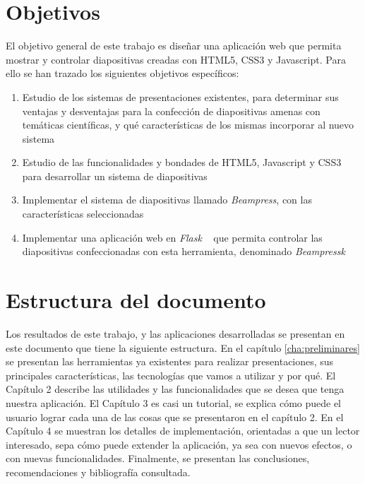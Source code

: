 \begin{introduction}
	\section{Objetivos} %
	\label{sec:objetivos}

		El objetivo general de este trabajo es diseñar una aplicación web que permita mostrar y controlar diapositivas creadas con HTML5, CSS3 y Javascript. Para ello se han trazado los siguientes objetivos específicos:

		\begin{enumerate}
			\item Estudio de los sistemas de presentaciones existentes, para determinar sus ventajas y desventajas para la confección de diapositivas amenas con temáticas científicas, y qué características de los mismas incorporar al nuevo sistema
			\item Estudio de las funcionalidades y bondades de HTML5, Javascript y CSS3 para desarrollar un sistema de diapositivas
			\item Implementar el sistema de diapositivas llamado \textit{Beampress}, con las características seleccionadas
			\item Implementar una aplicación web en \textit{Flask} ~\cite{flask} que permita controlar las diapositivas confeccionadas con esta herramienta, denominado \textit{Beampressk}
		\end{enumerate}

	\section*{Estructura del documento} %
	\label{sec:estructura_del_documento}
	
		Los resultados de este trabajo, y las aplicaciones desarrolladas se presentan en este documento que tiene la siguiente estructura. En el capítulo \ref{cha:preliminares} se presentan las herramientas ya existentes para realizar presentaciones, sus principales características, las tecnologías que vamos a utilizar y por qué. El Capítulo 2 describe las utilidades y las funcionalidades que se desea que tenga nuestra aplicación. El Capítulo 3 es casi un tutorial, se explica cómo puede el usuario lograr cada una de las cosas que se presentaron en el capítulo 2. En el Capítulo 4 se muestran los detalles de implementación, orientadas a que un lector interesado, sepa cómo puede extender la aplicación, ya sea con nuevos efectos, o con nuevas funcionalidades. Finalmente, se presentan las conclusiones, recomendaciones y bibliografía consultada.





\end{introduction}




